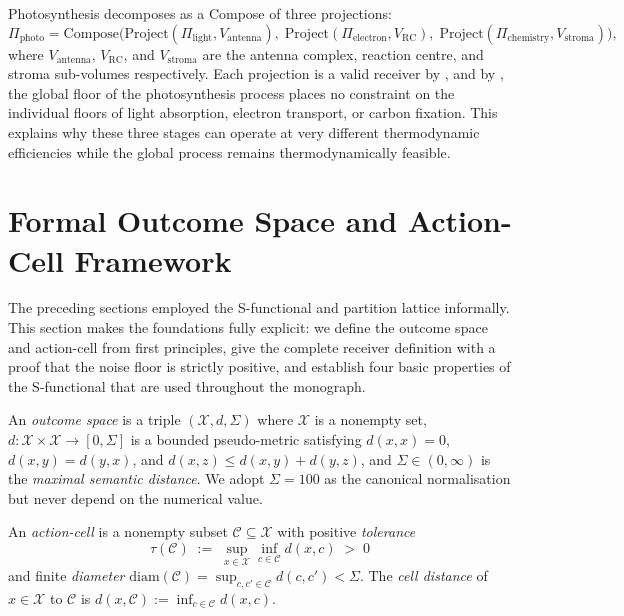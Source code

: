 \begin{example}
\label{ex:photosynthesis}
Photosynthesis decomposes as a Compose of three projections:
\[
  \Pi_{\mathrm{photo}}
  = \mathrm{Compose}\bigl(
    \mathrm{Project}(\Pi_{\mathrm{light}}, V_{\mathrm{antenna}}),\;
    \mathrm{Project}(\Pi_{\mathrm{electron}}, V_{\mathrm{RC}}),\;
    \mathrm{Project}(\Pi_{\mathrm{chemistry}}, V_{\mathrm{stroma}})
  \bigr) ,
\]
where $V_{\mathrm{antenna}}$, $V_{\mathrm{RC}}$, and $V_{\mathrm{stroma}}$
are the antenna complex, reaction centre, and stroma sub-volumes respectively.
Each projection is a valid receiver by , and by
, the global floor of the photosynthesis
process places no constraint on the individual floors of light absorption,
electron transport, or carbon fixation.  This explains why these three stages
can operate at very different thermodynamic efficiencies while the global
process remains thermodynamically feasible.
\end{example}

\section{Formal Outcome Space and Action-Cell Framework}
\label{sec:outcome-action-cell}

The preceding sections employed the S-functional and partition lattice
informally.  This section makes the foundations fully explicit: we define
the outcome space and action-cell from first principles, give the complete
receiver definition with a proof that the noise floor is strictly positive,
and establish four basic properties of the S-functional that are used
throughout the monograph.

\begin{definition}
\label{def:outcome-space}
An \emph{outcome space} is a triple $(\mathcal{X}, d, \Sigma)$ where
$\mathcal{X}$ is a nonempty set, $d : \mathcal{X} \times \mathcal{X}
\to [0, \Sigma]$ is a bounded pseudo-metric satisfying $d(x,x) = 0$,
$d(x,y) = d(y,x)$, and $d(x,z) \leq d(x,y) + d(y,z)$, and
$\Sigma \in (0, \infty)$ is the \emph{maximal semantic distance}.  We adopt
$\Sigma = 100$ as the canonical normalisation but never depend on the numerical
value.
\end{definition}

\begin{definition}
\label{def:action-cell-formal}
An \emph{action-cell} is a nonempty subset $\mathcal{C} \subseteq \mathcal{X}$
with positive \emph{tolerance}
\[
  \tau(\mathcal{C}) \;:=\; \sup_{x \in \mathcal{X}} \inf_{c \in \mathcal{C}}
  d(x, c) \;>\; 0
\]
and finite \emph{diameter} $\mathrm{diam}(\mathcal{C}) =
\sup_{c, c' \in \mathcal{C}} d(c, c') < \Sigma$.  The \emph{cell distance} of
$x \in \mathcal{X}$ to $\mathcal{C}$ is $d(x, \mathcal{C}) :=
\inf_{c \in \mathcal{C}} d(x, c)$.
\end{definition}

